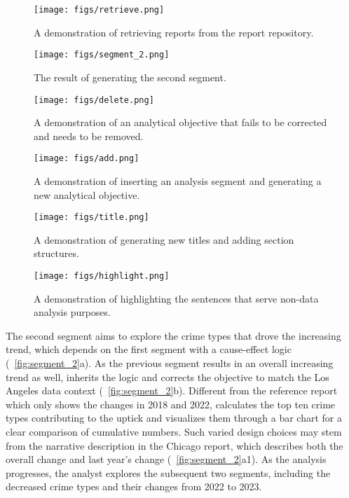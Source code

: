 \begin{figure}[!htb] 
  \centering
  \texttt{[image: figs/retrieve.png]}
  \caption{
    A demonstration of retrieving reports from the report repository.
  }
  \label{fig:retrieve}
\end{figure}


\begin{figure}[!htb] 
  \centering
  \texttt{[image: figs/segment\_2.png]}
  \caption{
    The result of generating the second segment. 
  }
  \label{fig:segment_2}
\end{figure}

\begin{figure}[!htb] 
  \centering
  \texttt{[image: figs/delete.png]}
  \caption{
  A demonstration of an analytical objective that fails to be corrected and needs to be removed. 
  }
  \label{fig:delete}
\end{figure}

\begin{figure}[!htb] 
  \centering
  \texttt{[image: figs/add.png]}
  \caption{
  A demonstration of inserting an analysis segment and generating a new analytical objective. 
  }
  \label{fig:add}
\end{figure}

\begin{figure}[!htb] 
  \centering
  \texttt{[image: figs/title.png]}
  \caption{
    A demonstration of generating new titles and adding section structures. 
  }
  \label{fig:title}
\end{figure}

\begin{figure}[!htb] 
  \centering
  \texttt{[image: figs/highlight.png]}
  \caption{
    A demonstration of highlighting the sentences that serve non-data analysis purposes. 
  }
  \label{fig:highlight}
\end{figure}

The second segment aims to explore the crime types that drove the increasing trend, which depends on the first segment with a cause-effect logic (~\autoref{fig:segment_2}a). 
As the previous segment results in an overall increasing trend as well, \system{} inherits the logic and corrects the objective to match the Los Angeles data context (~\autoref{fig:segment_2}b). 
Different from the reference report which only shows the changes in 2018 and 2022, \system{} calculates the top ten crime types contributing to the uptick and visualizes them through a bar chart for a clear comparison of cumulative numbers. 
Such varied design choices may stem from the narrative description in the Chicago report, which describes both the overall change and last year's change (~\autoref{fig:segment_2}a1). 
As the analysis progresses, the analyst explores the subsequent two segments, including the decreased crime types and their changes from 2022 to 2023. 

